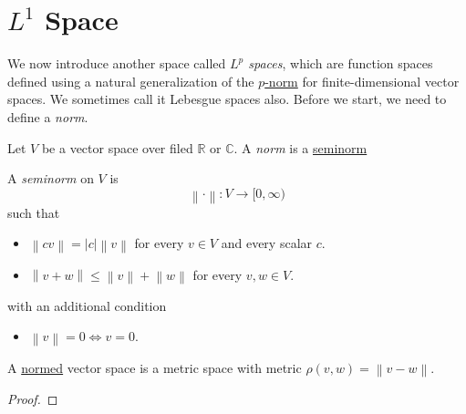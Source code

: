 \section{\(L^1\) Space}
We now introduce another space called \emph{\(L^p\) spaces}, which are function spaces defined using a natural generalization of the \hyperref[eg:p-norm]{\(p\)-norm} for finite-dimensional vector spaces. We sometimes call it Lebesgue spaces also. Before we start, we need to define a \emph{norm}.

\begin{definition}[Norm]\label{def:norm}
	Let \(V\) be a vector space over filed \(\mathbb{R} \) or \(\mathbb{C} \). A \emph{norm} is a \hyperref[def:seminorm]{seminorm}
	\begin{definition}[Seminorm]\label{def:seminorm}
		A \emph{seminorm} on \(V\) is
		\[
			\left\lVert \cdot\right\rVert \colon V\to [0, \infty )
		\]
		such that
		\begin{itemize}
			\item \(\left\lVert c v\right\rVert =\left\vert c \right\vert \left\lVert v\right\rVert \) for every \(v\in V\) and every scalar \(c\).
			\item \(\left\lVert  v+w\right\rVert \leq \left\lVert v\right\rVert +\left\lVert w\right\rVert \) for every \(v, w\in V\).
		\end{itemize}
	\end{definition}
	with an additional condition
	\begin{itemize}
		\item \(\left\lVert v\right\rVert = 0 \iff v = 0\).
	\end{itemize}
\end{definition}

\begin{lemma}
	A \hyperref[def:norm]{normed} vector space is a metric space with metric \(\rho (v, w) = \left\lVert v - w\right\rVert\).
\end{lemma}
\begin{proof}
\end{proof}

